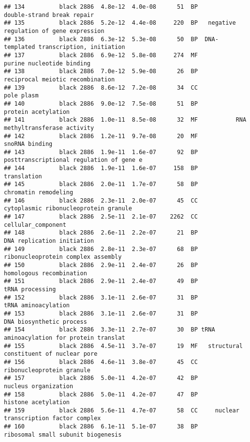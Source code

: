 \documentclass[]{article}
\begin{document}
\begin{verbatim}
## 134          black 2886  4.8e-12  4.0e-08      51  BP               double-strand break repair
## 135          black 2886  5.2e-12  4.4e-08     220  BP   negative regulation of gene expression
## 136          black 2886  6.3e-12  5.3e-08      50  BP  DNA-templated transcription, initiation
## 137          black 2886  6.9e-12  5.8e-08     274  MF                purine nucleotide binding
## 138          black 2886  7.0e-12  5.9e-08      26  BP         reciprocal meiotic recombination
## 139          black 2886  8.6e-12  7.2e-08      34  CC                               pole plasm
## 140          black 2886  9.0e-12  7.5e-08      51  BP                      protein acetylation
## 141          black 2886  1.0e-11  8.5e-08      32  MF           RNA methyltransferase activity
## 142          black 2886  1.2e-11  9.7e-08      20  MF                           snoRNA binding
## 143          black 2886  1.9e-11  1.6e-07      92  BP posttranscriptional regulation of gene e
## 144          black 2886  1.9e-11  1.6e-07     158  BP                              translation
## 145          black 2886  2.0e-11  1.7e-07      58  BP                     chromatin remodeling
## 146          black 2886  2.3e-11  2.0e-07      45  CC    cytoplasmic ribonucleoprotein granule
## 147          black 2886  2.5e-11  2.1e-07    2262  CC                       cellular_component
## 148          black 2886  2.6e-11  2.2e-07      21  BP               DNA replication initiation
## 149          black 2886  2.8e-11  2.3e-07      68  BP       ribonucleoprotein complex assembly
## 150          black 2886  2.9e-11  2.4e-07      26  BP                 homologous recombination
## 151          black 2886  2.9e-11  2.4e-07      49  BP                          tRNA processing
## 152          black 2886  3.1e-11  2.6e-07      31  BP                      tRNA aminoacylation
## 153          black 2886  3.1e-11  2.6e-07      31  BP                 DNA biosynthetic process
## 154          black 2886  3.3e-11  2.7e-07      30  BP tRNA aminoacylation for protein translat
## 155          black 2886  4.5e-11  3.7e-07      19  MF   structural constituent of nuclear pore
## 156          black 2886  4.6e-11  3.8e-07      45  CC                ribonucleoprotein granule
## 157          black 2886  5.0e-11  4.2e-07      42  BP                     nucleus organization
## 158          black 2886  5.0e-11  4.2e-07      47  BP                      histone acetylation
## 159          black 2886  5.6e-11  4.7e-07      58  CC     nuclear transcription factor complex
## 160          black 2886  6.1e-11  5.1e-07      38  BP       ribosomal small subunit biogenesis

\end{verbatim}
\end{document}
